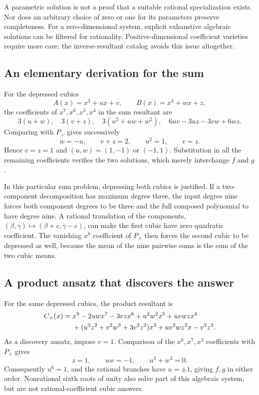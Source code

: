 \documentclass[11pt,letterpaper]{article}
\theoremstyle{definition}
\begin{document}
A parametric solution is not a proof that a suitable rational specialization exists. Nor does an arbitrary choice of zero or one for its parameters preserve completeness. For a zero-dimensional system, explicit exhaustive algebraic solutions can be filtered for rationality. Positive-dimensional coefficient varieties require more care; the inverse-resultant catalog avoids this issue altogether.

\subsection{An elementary derivation for the sum}
For the depressed cubics
\[
 A(x)=x^3+ux+v,\qquad B(x)=x^3+wx+z,
\]
the coefficients of $x^7,x^6,x^5,x^4$ in the sum resultant are
\[
 3(u+w),\quad 3(v+z),\quad
 3(u^2+uw+w^2),\quad
 6uv-3uz-3vw+6wz.
\]
Comparing with $P_+$ gives successively
\[
 w=-u,\qquad v+z=2,\qquad u^2=1,\qquad v=z.
\]
Hence $v=z=1$ and $(u,w)=(1,-1)$ or $(-1,1)$. Substitution in all the remaining coefficients verifies the two solutions, which merely interchange $f$ and $g$.

In this particular sum problem, depressing both cubics is justified. If a two-component decomposition has maximum degree three, the input degree nine forces both component degrees to be three and the full composed polynomial to have degree nine. A rational translation of the components, $(\beta,\gamma)\mapsto(\beta+c,\gamma-c)$, can make the first cubic have zero quadratic coefficient. The vanishing $x^8$ coefficient of $P_+$ then forces the second cubic to be depressed as well, because the mean of the nine pairwise sums is the sum of the two cubic means.

\subsection{A product ansatz that discovers the answer}
For the same depressed cubics, the product resultant is
\begin{align}\label{eq:genericproduct}
 C_{\times}(x)={}&x^9-2uwx^7-3vzx^6+u^2w^2x^5+u v w z x^4\notag\\
 &+(u^3z^2+v^2w^3+3v^2z^2)x^3
   +uv^2wz^2x-v^3z^3.
\end{align}
As a discovery ansatz, impose $v=1$. Comparison of the $x^6,x^7,x^3$ coefficients with $P_{\times}$ gives
\[
 z=1,\qquad uw=-1,\qquad u^3+w^3=0.
\]
Consequently $u^6=1$, and the rational branches have $u=\pm1$, giving $f,g$ in either order. Nonrational sixth roots of unity also solve part of this algebraic system, but are not rational-coefficient cubic answers.
\end{document}
